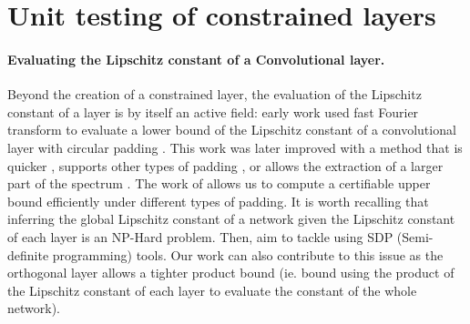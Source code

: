 



\section{Unit testing of constrained layers} \label{sec:unit_testing}

    \paragraph{Evaluating the Lipschitz constant of a Convolutional layer.}
    Beyond the creation of a constrained layer, the evaluation of the Lipschitz constant of a layer is by itself an active field: early work used fast Fourier transform to evaluate a lower bound of the Lipschitz constant of a convolutional layer with circular padding \cite{sedghi_singular_2019}. This work was later improved with a method that is quicker \cite{senderovich_towards_2022}, supports other types of padding \cite{grishina_tight_2024}, or allows the extraction of a larger part of the spectrum \cite{boroojeny_spectrum_2024}. The work of \cite{delattre2023efficient} \cite{delattre2024spectral} allows us to compute a certifiable upper bound efficiently under different types of padding.
    It is worth recalling that inferring the global Lipschitz constant of a network given the Lipschitz constant of each layer is an NP-Hard problem\cite{virmaux2018lipschitz}. Then, \cite{pauli_lipschitz_2024,fazlyab_efficient_2019,wang2024scalability} aim to tackle using SDP (Semi-definite programming) tools. Our work can also contribute to this issue as the orthogonal layer allows a tighter product bound (ie. bound using the product of the Lipschitz constant of each layer to evaluate the constant of the whole network).


